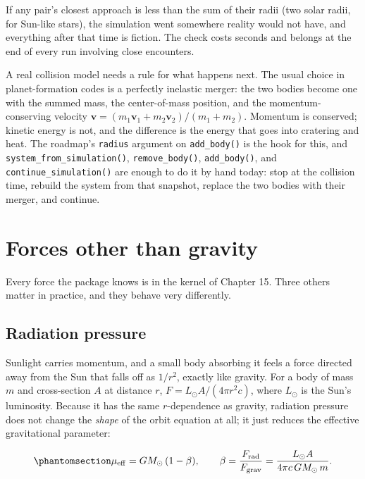 \documentclass[
  10.5pt,
  letterpaper,
]{scrbook}
\theoremstyle{plain}
\theoremstyle{remark}
\begin{document}
If any pair's closest approach is less than the sum of their radii (two
solar radii, for Sun-like stars), the simulation went somewhere reality
would not have, and everything after that time is fiction. The check
costs seconds and belongs at the end of every run involving close
encounters.

A real collision model needs a rule for what happens next. The usual
choice in planet-formation codes is a perfectly inelastic merger: the
two bodies become one with the summed mass, the center-of-mass position,
and the momentum-conserving velocity
\(\mathbf{v} = (m_1\mathbf{v}_1 + m_2\mathbf{v}_2)/(m_1+m_2)\). Momentum
is conserved; kinetic energy is not, and the difference is the energy
that goes into cratering and heat. The roadmap's \texttt{radius}
argument on \texttt{add\_body()} is the hook for this, and
\texttt{system\_from\_simulation()}, \texttt{remove\_body()},
\texttt{add\_body()}, and \texttt{continue\_simulation()} are enough to
do it by hand today: stop at the collision time, rebuild the system from
that snapshot, replace the two bodies with their merger, and continue.

\section{Forces other than gravity}\label{forces-other-than-gravity}

Every force the package knows is in the kernel of Chapter 15. Three
others matter in practice, and they behave very differently.

\subsection{Radiation pressure}\label{radiation-pressure}

Sunlight carries momentum, and a small body absorbing it feels a force
directed away from the Sun that falls off as \(1/r^2\), exactly like
gravity. For a body of mass \(m\) and cross-section \(A\) at distance
\(r\), \(F = L_\odot A/(4\pi r^2 c)\), where \(L_\odot\) is the Sun's
luminosity. Because it has the same \(r\)-dependence as gravity,
radiation pressure does not change the \emph{shape} of the orbit
equation at all; it just reduces the effective gravitational parameter:

\begin{equation}\protect\phantomsection\label{eq-beta}{
\mu_{\mathrm{eff}} = GM_\odot\,(1 - \beta), \qquad \beta = \frac{F_{\mathrm{rad}}}{F_{\mathrm{grav}}} = \frac{L_\odot A}{4\pi c\,GM_\odot\,m}.
}\end{equation}
\end{document}
